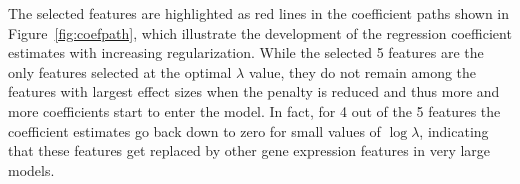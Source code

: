 \documentclass[nojss]{jss}
\begin{document}
The selected features are highlighted as red lines in the coefficient paths shown in Figure~\ref{fig:coefpath}, which illustrate the development of the regression coefficient estimates with increasing regularization. While the selected 5 features are the only features selected at the optimal $\lambda$ value, they do not remain among the features with largest effect sizes when the penalty is reduced and thus more and more coefficients start to enter the model. In fact, for 4 out of the 5 features the coefficient estimates go back down to zero for small values of $\log\lambda$, indicating that these features get replaced by other gene expression features in very large models.

\begin{Schunk}
\end{Schunk}
\end{document}
